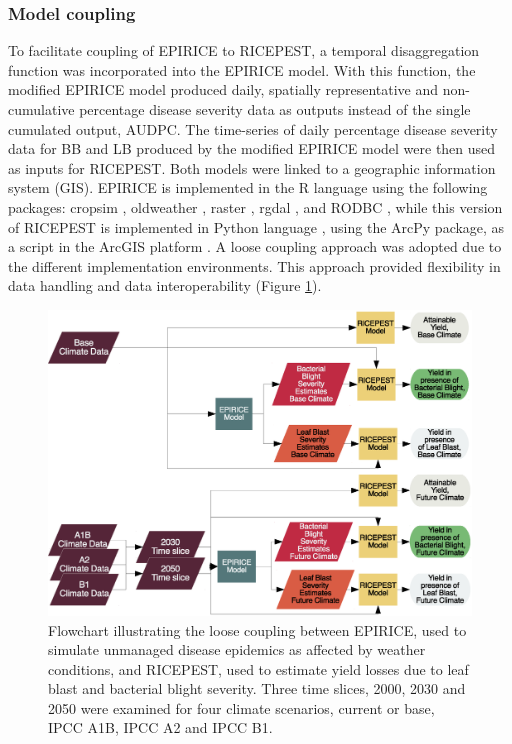 \documentclass[preprint,review,12pt]{elsarticle}
\begin{document}
    \subsubsection{Model coupling}
    To facilitate coupling of EPIRICE to RICEPEST, a temporal disaggregation function was incorporated into the EPIRICE model. With this function, the modified EPIRICE model produced daily, spatially representative and non-cumulative percentage disease severity data as outputs instead of the single cumulated output, AUDPC. The time-series of daily percentage disease severity data for BB and LB produced by the modified EPIRICE model were then used as inputs for RICEPEST. Both models were linked to a geographic information system (GIS). EPIRICE is implemented in the R language using the following packages: cropsim \cite{Hijmans2009}, oldweather \cite{Hijmans2009}, raster \cite{Hijmans2014}, rgdal \cite{Bivand2014}, and RODBC \cite{Ripley2013}, while this version of RICEPEST is implemented in Python language \cite{python}, using the ArcPy package, as a script in the ArcGIS platform \cite{ESRI2011}. A loose coupling approach was adopted due to the different implementation environments. This approach provided flexibility in data handling and data interoperability (Figure \ref{Flowchart}).
    
     \begin{figure}[H]
      \includegraphics[width = 140mm]{figures/Simulation_Tree_Flowchart}
      \caption{Flowchart illustrating the loose coupling between EPIRICE, used to simulate unmanaged disease epidemics as affected by weather conditions, and RICEPEST, used to estimate yield losses due to leaf blast and bacterial blight severity. Three time slices, 2000, 2030 and 2050 were examined for four climate scenarios, current or base, IPCC A1B, IPCC A2 and IPCC B1.}
      \label{Flowchart}
    \end{figure} 
    
\end{document}
